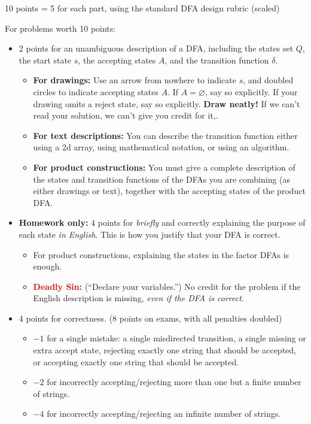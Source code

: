 \documentclass[11pt]{article}
\begin{document}
\begin{enumerate}
\begin{rubric}
10 points = 5 for each part, using the standard DFA design rubric (scaled)
\end{rubric}


\vfil

\begin{rubric}
For problems worth 10 points:
\begin{itemize}
\item
2 points for an unambiguous description of a DFA, including the states set $Q$, the start state $s$, the accepting states $A$, and the transition function $\delta$.
\begin{itemize}
\item
\textbf{For drawings:} Use an arrow from nowhere to indicate $s$, and doubled circles to indicate accepting states $A$.  If $A=\varnothing$, say so explicitly.  If your drawing omits a reject state, say so explicitly.  \textbf{Draw neatly!}  If we can't read your solution, we can't give you credit for it,.

\item
\textbf{For text descriptions:} You can describe the transition function either using a 2d array, using mathematical notation, or using an algorithm.

\item
\textbf{For product constructions:} You must give a complete description of the states and transition functions of the DFAs you are combining (as either drawings or text), together with the accepting states of the product DFA.

\end{itemize}

\item
\textbf{Homework only:}
4 points for \emph{briefly} and correctly explaining the purpose of each state \emph{in English}.  This is how you justify that your DFA is correct.
\begin{itemize}
\item
For product constructions, explaining the states in the factor DFAs is enough.
\item
\textcolor{Red}{\textbf{Deadly Sin:}} (“Declare your variables.”) No credit for the problem if the English description is missing, \emph{even if the DFA is correct}.
\end{itemize}


\item
4 points for correctness.  (8 points on exams, with all penalties doubled)
\begin{itemize}\itemsep0pt
\item $-1$ for a single mistake: a single misdirected transition, a single missing or extra accept state, rejecting exactly one string that should be accepted, or accepting exactly one string that should be accepted.
\item
$-2$ for incorrectly accepting/rejecting more than one but a finite number of strings.
\item
$-4$ for incorrectly accepting/rejecting an infinite number of strings.
\end{itemize}


\end{itemize}
\end{rubric}
\end{enumerate}
\end{document}

